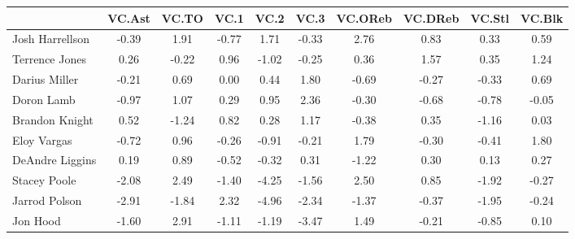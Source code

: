\documentclass[10pt]{article}
\begin{document}
\begin{table}[ht]
\begin{center}
\begin{tabular}{lccccccccc}
  \hline
 & VC.Ast & VC.TO & VC.1 & VC.2 & VC.3 & VC.OReb & VC.DReb & VC.Stl & VC.Blk \\ 
  \hline
Josh Harrellson & -0.39 & 1.91 & -0.77 & 1.71 & -0.33 & 2.76 & 0.83 & 0.33 & 0.59 \\ 
  Terrence Jones & 0.26 & -0.22 & 0.96 & -1.02 & -0.25 & 0.36 & 1.57 & 0.35 & 1.24 \\ 
  Darius Miller & -0.21 & 0.69 & 0.00 & 0.44 & 1.80 & -0.69 & -0.27 & -0.33 & 0.69 \\ 
  Doron Lamb & -0.97 & 1.07 & 0.29 & 0.95 & 2.36 & -0.30 & -0.68 & -0.78 & -0.05 \\ 
  Brandon Knight & 0.52 & -1.24 & 0.82 & 0.28 & 1.17 & -0.38 & 0.35 & -1.16 & 0.03 \\ 
  Eloy Vargas & -0.72 & 0.96 & -0.26 & -0.91 & -0.21 & 1.79 & -0.30 & -0.41 & 1.80 \\ 
  DeAndre Liggins & 0.19 & 0.89 & -0.52 & -0.32 & 0.31 & -1.22 & 0.30 & 0.13 & 0.27 \\ 
  Stacey Poole & -2.08 & 2.49 & -1.40 & -4.25 & -1.56 & 2.50 & 0.85 & -1.92 & -0.27 \\ 
  Jarrod Polson & -2.91 & -1.84 & 2.32 & -4.96 & -2.34 & -1.37 & -0.37 & -1.95 & -0.24 \\ 
  Jon Hood & -1.60 & 2.91 & -1.11 & -1.19 & -3.47 & 1.49 & -0.21 & -0.85 & 0.10 \\ 
   \hline
\end{tabular}
\end{center}
\end{table}
\end{document}
